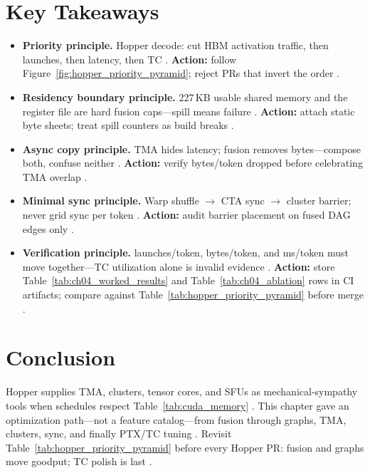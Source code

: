 \section{Key Takeaways}
\label{sec:ch04_key_takeaways}

\begin{itemize}
\item \textbf{Priority principle.}
Hopper decode: cut HBM activation traffic, then launches, then latency, then TC \citep{memoryfloor2026,taxbreak2026}.
\textbf{Action:} follow Figure~\ref{fig:hopper_priority_pyramid}; reject PRs that invert the order \citep{patel2025llminference}.

\item \textbf{Residency boundary principle.}
227\,KB usable shared memory and the register file are hard fusion caps---spill means failure \citep{nvidia2022hopper,yirage2026}.
\textbf{Action:} attach static byte sheets; treat spill counters as build breaks \citep{memoryfloor2026}.

\item \textbf{Async copy principle.}
TMA hides latency; fusion removes bytes---compose both, confuse neither \citep{semianalysis2024tma,memoryfloor2026}.
\textbf{Action:} verify bytes/token dropped before celebrating TMA overlap \citep{patel2025llminference}.

\item \textbf{Minimal sync principle.}
Warp shuffle $\rightarrow$ CTA sync $\rightarrow$ cluster barrier; never grid sync per token \citep{dao2022flashattention,nvidia2022hopper}.
\textbf{Action:} audit barrier placement on fused DAG edges only \citep{yirage2026}.

\item \textbf{Verification principle.}
launches/token, bytes/token, and ms/token must move together---TC utilization alone is invalid evidence \citep{taxbreak2026,memoryfloor2026}.
\textbf{Action:} store Table~\ref{tab:ch04_worked_results} and Table~\ref{tab:ch04_ablation} rows in CI artifacts; compare against Table~\ref{tab:hopper_priority_pyramid} before merge \citep{yirage2026,patel2025llminference}.
\end{itemize}

\section{Conclusion}
\label{sec:ch04_conclusion}

Hopper supplies TMA, clusters, tensor cores, and SFUs as mechanical-sympathy tools when schedules respect Table~\ref{tab:cuda_memory} \citep{nvidia2022hopper,semianalysis2024tma,dao2022flashattention}.
This chapter gave an optimization path---not a feature catalog---from fusion through graphs, TMA, clusters, sync, and finally PTX/TC tuning \citep{yirage2026,chen2020compilerbasedhardw,taxbreak2026,memoryfloor2026}.
Revisit Table~\ref{tab:hopper_priority_pyramid} before every Hopper PR: fusion and graphs move goodput; TC polish is last \citep{patel2025llminference,memoryfloor2026,taxbreak2026}.

